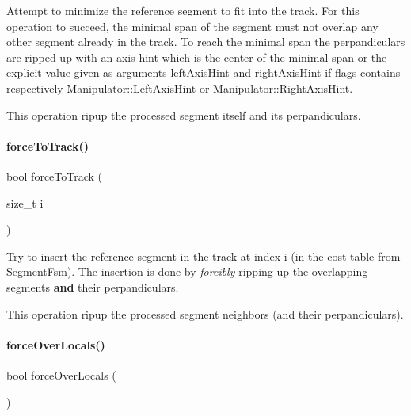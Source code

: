 Attempt to minimize the reference segment to fit into the track. For this operation to succeed, the minimal span of the segment must not overlap any other segment already in the track. To reach the minimal span the perpandiculars are ripped up with an axis hint which is the center of the minimal span or the explicit value given as arguments {\ttfamily left\+Axis\+Hint} and {\ttfamily right\+Axis\+Hint} if {\ttfamily flags} contains respectively \hyperlink{classKite_1_1Manipulator_a2af2ad6b6441614038caf59d04b3b217ab525fc8ee72323922f991c26e098bd5a}{Manipulator\+::\+Left\+Axis\+Hint} or \hyperlink{classKite_1_1Manipulator_a2af2ad6b6441614038caf59d04b3b217a4412082ce8109b740834fe21e7a671fb}{Manipulator\+::\+Right\+Axis\+Hint}.

This operation ripup the processed segment itself and its perpandiculars. \mbox{\label{classKite_1_1Manipulator_a76d3956660cfa624696e2a5f2916cd22}} 
\paragraph{\texorpdfstring{force\+To\+Track()}{forceToTrack()}}
{\footnotesize\ttfamily bool force\+To\+Track (\begin{DoxyParamCaption}\item[{size\+\_\+t}]{i }\end{DoxyParamCaption})}

Try to insert the reference segment in the track at index {\ttfamily i} (in the cost table from \hyperlink{classKite_1_1SegmentFsm}{Segment\+Fsm}). The insertion is done by {\itshape forcibly} ripping up the overlapping segments {\bfseries and} their perpandiculars.

This operation ripup the processed segment neighbors (and their perpandiculars). \mbox{\label{classKite_1_1Manipulator_add26b688d75a99a1ae781787eead08d5}} 
\paragraph{\texorpdfstring{force\+Over\+Locals()}{forceOverLocals()}}
{\footnotesize\ttfamily bool force\+Over\+Locals (\begin{DoxyParamCaption}{ }\end{DoxyParamCaption})}

